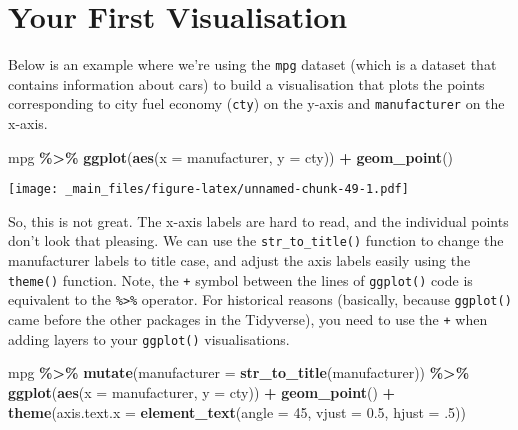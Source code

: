 \documentclass[
]{book}
\newenvironment{Shaded}{\begin{snugshade}}{\end{snugshade}}
\newcommand{\AttributeTok}[1]{\textcolor[rgb]{0.13,0.29,0.53}{#1}}
\newcommand{\DecValTok}[1]{\textcolor[rgb]{0.00,0.00,0.81}{#1}}
\newcommand{\FloatTok}[1]{\textcolor[rgb]{0.00,0.00,0.81}{#1}}
\newcommand{\FunctionTok}[1]{\textcolor[rgb]{0.13,0.29,0.53}{\textbf{#1}}}
\newcommand{\NormalTok}[1]{#1}
\newcommand{\SpecialCharTok}[1]{\textcolor[rgb]{0.81,0.36,0.00}{\textbf{#1}}}
\begin{document}
\hypertarget{your-first-visualisation}{%
\section{Your First Visualisation}\label{your-first-visualisation}}

Below is an example where we're using the \texttt{mpg} dataset (which is a dataset that contains information about cars) to build a visualisation that plots the points corresponding to city fuel economy (\texttt{cty}) on the y-axis and \texttt{manufacturer} on the x-axis.

\begin{Shaded}
\begin{Highlighting}[]
\NormalTok{mpg }\SpecialCharTok{\%\textgreater{}\%}
  \FunctionTok{ggplot}\NormalTok{(}\FunctionTok{aes}\NormalTok{(}\AttributeTok{x =}\NormalTok{ manufacturer, }\AttributeTok{y =}\NormalTok{ cty)) }\SpecialCharTok{+} 
  \FunctionTok{geom\_point}\NormalTok{() }
\end{Highlighting}
\end{Shaded}

\texttt{[image: \_main\_files/figure-latex/unnamed-chunk-49-1.pdf]}

So, this is not great. The x-axis labels are hard to read, and the individual points don't look that pleasing. We can use the \texttt{str\_to\_title()} function to change the manufacturer labels to title case, and adjust the axis labels easily using the \texttt{theme()} function. Note, the \texttt{+} symbol between the lines of \texttt{ggplot()} code is equivalent to the \texttt{\%\textgreater{}\%} operator. For historical reasons (basically, because \texttt{ggplot()} came before the other packages in the Tidyverse), you need to use the \texttt{+} when adding layers to your \texttt{ggplot()} visualisations.

\begin{Shaded}
\begin{Highlighting}[]
\NormalTok{mpg }\SpecialCharTok{\%\textgreater{}\%}
  \FunctionTok{mutate}\NormalTok{(}\AttributeTok{manufacturer =} \FunctionTok{str\_to\_title}\NormalTok{(manufacturer)) }\SpecialCharTok{\%\textgreater{}\%}
  \FunctionTok{ggplot}\NormalTok{(}\FunctionTok{aes}\NormalTok{(}\AttributeTok{x =}\NormalTok{ manufacturer, }\AttributeTok{y =}\NormalTok{ cty)) }\SpecialCharTok{+} 
  \FunctionTok{geom\_point}\NormalTok{() }\SpecialCharTok{+}
  \FunctionTok{theme}\NormalTok{(}\AttributeTok{axis.text.x =} \FunctionTok{element\_text}\NormalTok{(}\AttributeTok{angle =} \DecValTok{45}\NormalTok{, }\AttributeTok{vjust =} \FloatTok{0.5}\NormalTok{, }\AttributeTok{hjust =}\NormalTok{ .}\DecValTok{5}\NormalTok{))}
\end{Highlighting}
\end{Shaded}
\end{document}
